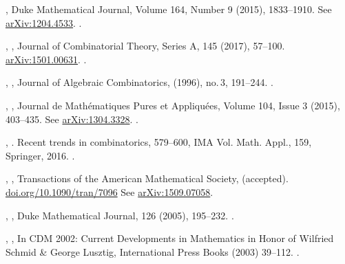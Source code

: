 \documentclass[12pt]{amsart}
\theoremstyle{plain}
\theoremstyle{definition}
\theoremstyle{remark}
\begin{document}
\begin{thebibliography}{10}
,
Duke Mathematical Journal, 
Volume 164, Number 9 (2015), 1833--1910.
See \href{https://arxiv.org/pdf/1204.4533.pdf}{arXiv:1204.4533}. .

,
,
Journal of Combinatorial Theory, Series A, 145 (2017), 57--100.
\href{https://arxiv.org/pdf/1501.00631.pdf}{arXiv:1501.00631}. .

  ,
 , 
 Journal of Algebraic Combinatorics,  (1996), no.\,3, 191--244. .

,
,
Journal de Math\'ematiques Pures et Appliqu\'ees,
Volume 104, Issue 3 (2015),  403--435.
See \href{http://arxiv.org/abs/1304.3328}{arXiv:1304.3328}.  .

,
. 
Recent trends in combinatorics, 579--600, IMA Vol. Math. Appl., 159, Springer, 2016. .


, 
,  
Transactions of the American Mathe\-matical Society, (accepted).
\href{https://doi.org/10.1090/tran/7096}{doi.org/10.1090/tran/7096} 
See \href{http://arxiv.org/abs/1509.07058}{arXiv:1509.07058}.

,
,
Duke Mathematical Journal,  126 (2005), 195--232. .


,
,  
In CDM 2002: Current Developments in Mathematics in Honor of  Wilfried Schmid \& George Lusztig, 
International Press Books  (2003) 39--112. . 


\end{thebibliography}
\end{document}

